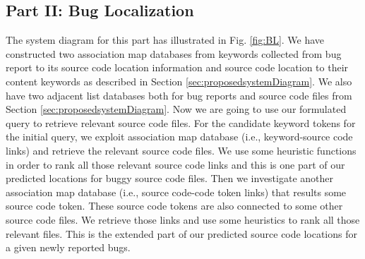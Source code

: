 \documentclass{sig-alternate}
\begin{document}
\subsection{Part II: Bug Localization}

The system diagram for this part has illustrated in Fig. \ref{fig:BL}.
We have constructed two association map databases from keywords collected from bug report to its source code location information and source code location to their content keywords as described in Section \ref{sec:proposedsystemDiagram}.
We also have two adjacent list databases both for bug reports and source code files from Section \ref{sec:proposedsystemDiagram}. Now we are going to use our formulated query to retrieve relevant source code files. 
For the candidate keyword tokens for the initial query, we exploit association map database (i.e., keyword-source code links) and retrieve the relevant source code files. We use some heuristic functions in order to rank all those relevant source code links and this is one part of our predicted locations for buggy source code files.
Then we investigate another association map database (i.e., source code-code token links) that results some source code token. These source code tokens are also connected to some other source code files. We retrieve those links and use some heuristics to rank all those relevant files. This is the extended part of our predicted source code locations for a given newly reported bugs.
\end{document}

